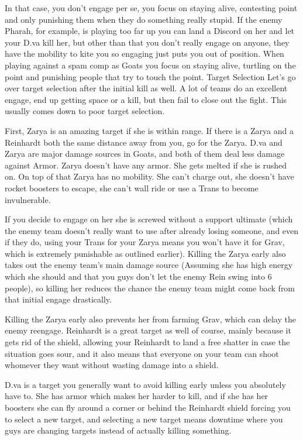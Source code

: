 In that case, you don’t engage per se, you focus on staying alive, contesting point and only punishing them when they do something really stupid. If the enemy Pharah, for example, is playing too far up you can land a Discord on her and let your D.va kill her, but other than that you don’t really engage on anyone, they have the mobility to kite you so engaging just puts you out of position. When playing against a spam comp as Goats you focus on staying alive, turtling on the point and punishing people that try to touch the point.
Target Selection 
Let’s go over target selection after the initial kill as well. A lot of teams do an excellent engage, end up getting space or a kill, but then fail to close out the fight. This usually comes down to poor target selection.

First, Zarya is an amazing target if she is within range. If there is a Zarya and a Reinhardt both the same distance away from you, go for the Zarya. D.va and Zarya are major damage sources in Goats, and both of them deal less damage against Armor. Zarya doesn’t have any armor. She gets melted if she is rushed on. On top of that Zarya has no mobility. She can’t charge out, she doesn’t have rocket boosters to escape, she can’t wall ride or use a Trans to become invulnerable.

If you decide to engage on her she is screwed without a support ultimate (which the enemy team doesn’t really want to use after already losing someone, and even if they do, using your Trans for your Zarya means you won’t have it for Grav, which is extremely punishable as outlined earlier). Killing the Zarya early also takes out the enemy team's main damage source (Assuming she has high energy which she should and that you guys don’t let the enemy Rein swing into 6 people), so killing her reduces the chance the enemy team might come back from that initial engage drastically.

Killing the Zarya early also prevents her from farming Grav, which can delay the enemy reengage. Reinhardt is a great target as well of course, mainly because it gets rid of the shield, allowing your Reinhardt to land a free shatter in case the situation goes sour, and it also means that everyone on your team can shoot whomever they want without wasting damage into a shield.




D.va is a target you generally want to avoid killing early unless you absolutely have to. She has armor which makes her harder to kill, and if she has her boosters she can fly around a corner or behind the Reinhardt shield forcing you to select a new target, and selecting a new target means downtime where you guys are changing targets instead of actually killing something.

